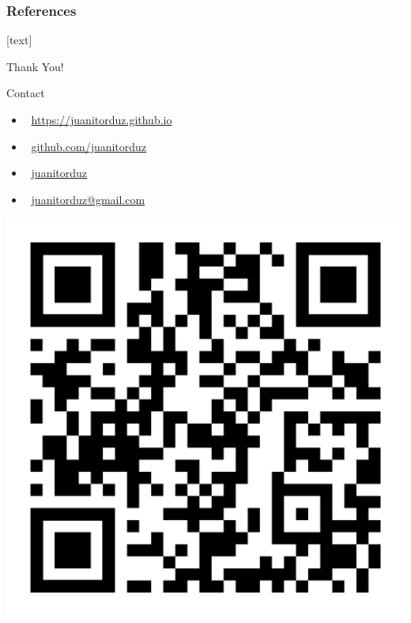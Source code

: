 \documentclass[10pt]{beamer}
\begin{document}
\begin{frame}[t, allowframebreaks]
\frametitle{References}
\footnotesize{
[text]

 
}
\end{frame}

\begin{frame}
\begin{center}
\huge{Thank You!}%
\end{center}

\begin{block}{Contact}
\begin{itemize}
\item \faRocket $\:$ \href{https://juanitorduz.github.io}{https://juanitorduz.github.io}
\item \faGithub $\:$ \href{https://github.com/juanitorduz}{github.com/juanitorduz}
\item \faTwitter $\:$ \href{https://twitter.com/juanitorduz}{juanitorduz}
\item \faEnvelope $\:$ \href{mailto:juanitorduz@gmail.com}{juanitorduz@gmail.com}
\end{itemize}
\end{block}

\begin{center}
\includegraphics[scale=0.08]{images/qr-code-juanitorduz.png} 
\end{center}

\end{frame}
\end{document}
